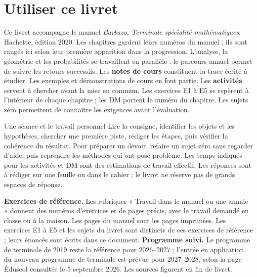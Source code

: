 \chapter*{Utiliser ce livret}
Ce livret accompagne le manuel \emph{Barbazo, Terminale spécialité mathématiques}, Hachette, édition 2020. Les chapitres gardent leurs numéros du manuel ; ils sont rangés ici selon leur première apparition dans la progression. L'analyse, la géométrie et les probabilités se travaillent en parallèle : le parcours annuel permet de suivre les retours successifs.
Les \textbf{notes de cours} constituent la trace écrite à étudier. Les exemples et démonstrations de cours en font partie. Les \textbf{activités} servent à chercher avant la mise en commun. Les exercices E1 à E5 se repèrent à l'intérieur de chaque chapitre ; les DM portent le numéro du chapitre. Les sujets zéro permettent de connaître les exigences avant l'évaluation.
\begin{retenir}{Une séance et le travail personnel}
Lire la consigne, identifier les objets et les hypothèses, chercher une première piste, rédiger les étapes, puis vérifier la cohérence du résultat. Pour préparer un devoir, refaire un sujet zéro sans regarder d'aide, puis reprendre les méthodes qui ont posé problème.
Les temps indiqués pour les activités et DM sont des estimations de travail effectif. Les réponses sont à rédiger sur une feuille ou dans le cahier ; le livret ne réserve pas de grands espaces de réponse.
\end{retenir}
\textbf{Exercices de référence.} Les rubriques « Travail dans le manuel ou une annale » donnent des numéros d'exercices et de pages précis, avec le travail demandé en classe ou à la maison. Les pages du manuel sont les pages imprimées. Les exercices E1 à E5 et les sujets du livret sont distincts de ces exercices de référence ; leurs énoncés sont écrits dans ce document.
\textbf{Programme suivi.} Le programme de terminale de 2019 reste la référence pour 2026--2027 ; l'entrée en application du nouveau programme de terminale est prévue pour 2027--2028, selon la page Éduscol consultée le 5 septembre 2026. Les sources figurent en fin de livret.
\ifprof
\clearpage
